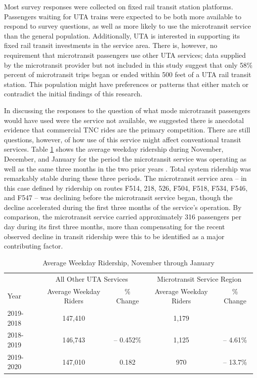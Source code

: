 \documentclass[smartcities,article,submit,moreauthors,pdftex]{Definitions/mdpi}
\begin{document}
Most survey responses were collected on fixed rail transit station platforms. Passengers waiting for UTA trains were expected to be both more available to respond to survey questions, as well as more likely to use the microtransit service than the general population. Additionally, UTA is interested in supporting its fixed rail transit investments in the service area. There is, however, no requirement that microtransit passengers use other UTA services; data supplied by the microtransit provider but not included in this study suggest that only 58\% percent of microtransit trips began or ended within 500 feet of a UTA rail transit station. This population might have preferences or patterns that either match or contradict the initial findings of this research. 

In discussing the responses to the question of what mode microtransit passengers would have used were the service not available, we suggested there is anecdotal evidence that commercial TNC rides are the primary competition. There are still questions, however, of how use of this service might affect conventional transit services. Table \ref{tab:uta-ridership} shows the average weekday ridership during November, December, and January for the period the microtransit service was operating as well as the same three months in the two prior years \citet{uta2020boardings}. Total system ridership was remarkably stable during these three periods. The microtransit service area – in this case defined by ridership on routes F514, 218, 526, F504, F518, F534, F546, and F547 – was declining before the microtransit service began, though the decline accelerated during the first three months of the service’s operation. By comparison, the microtransit service carried approximately 316 passengers per day during its first three months, more than compensating for the recent observed decline in transit ridership were this to be identified as a major contributing factor. 

\begin{table}[ht]
    \centering
    \renewcommand{\arraystretch}{1.5}
    \caption{Average Weekday Ridership, November through January}
    \label{tab:uta-ridership}
    \begin{tabular}{@{}lcccc@{}}
\toprule
          & \multicolumn{2}{c}{All   Other UTA Services} & \multicolumn{2}{c}{Microtransit   Service Region} \\
          \cmidrule(l){2-3} \cmidrule(l){4-5}
Year      & Average   Weekday Riders    & \%   Change    & Average   Weekday Riders    & \%   Change\\
\midrule
2019-2018 & 147,410                     &                & 1,179                       &            \\
2018-2019 & 146,743                     & –   0.452\%    & 1,125                       & –   4.61\% \\
2019-2020 & 147,010                     & 0.182          & 970                         & –   13.7\% \\
\bottomrule
\end{tabular}
\end{table}
\end{document}

